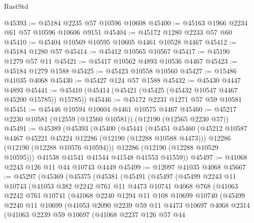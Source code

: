 \begin{lexlean}{RustStd}
\begin{coremodule}
@45393 := @45184 @2235 @57 @10596 @10608
@45400 := @45163 @1966 @2234 @61 @57 @10596 @10606 @9151
@45404 := @45172 @1280 @2233 @57 @60
@45410 := @45404 @10569 @10595 @10605 @4461 @10528 @4467
@45412 := @45184 @1280 @57
@45414 := @45412 @10565 @10567
@45417 := @45190 @1279 @57 @11
@45421 := @45417 @10562 @4893 @10536 @4467
@45423 := @45184 @1279 @1588
@45425 := @45423 @10558 @10560
@45427 := @15486 @41035 @4068
@45430 := @45427 @124 @57 @1588
@45432 := @45430 @4447 @4893
@45441 := @45410 (@45414 (@45421 (@45425 (@45432 @10547 @4467 @45200 @15785)) @15785))
@45446 := @45172 @2231 @1271 @57 @59 @10581
@45451 := @45446 @10594 @10604 @4461 @10575 @4467
@45460 := @45217 @2230 @10581 (@12559 (@12560 @10581)) (@12190 (@12565 @2230 @57))
@45491 := @45389
    (@45393
      (@45400
        (@45441
          (@45451
            @45460
            (@45212 @10587 @4467 @45221 @45224 @12286 (@12190 (@12288 @10588 @4473)))
            @12286
            (@12190 (@12288 @10576 @10594)))
          @12286
          (@12190 (@12288 @10529 @10595)))
        @41538
        @41541
        @41544
        @41548
        @41553
        @41559))
@45497 := @41068 @2243 @126 @11 @44 @10743 @4449
@45499 := @12097 @41035 @4068
@45667 := @45297
    (@45369
      (@45375
        (@45381
          (@45491
            (@45497
              (@45499
                @2243
                @11
                @10743
                (@41053
                  @382
                  @2242
                  @761
                  @11
                  @4473
                  @10741
                  @4068
                  @768
                  (@41063
                    @2242
                    @761
                    @10741
                    (@41068
                      @2240
                      @1294
                      @11
                      @108
                      @10699
                      @10740
                      (@45499
                        @2240
                        @11
                        @10699
                        (@41053
                          @2090
                          @2239
                          @59
                          @11
                          @4473
                          @10697
                          @4068
                          @2314
                          (@41063
                            @2239
                            @59
                            @10697
                            (@41068
                              @2237
                              @126
                              @57
                              @44

\end{coremodule}
\end{lexlean}

